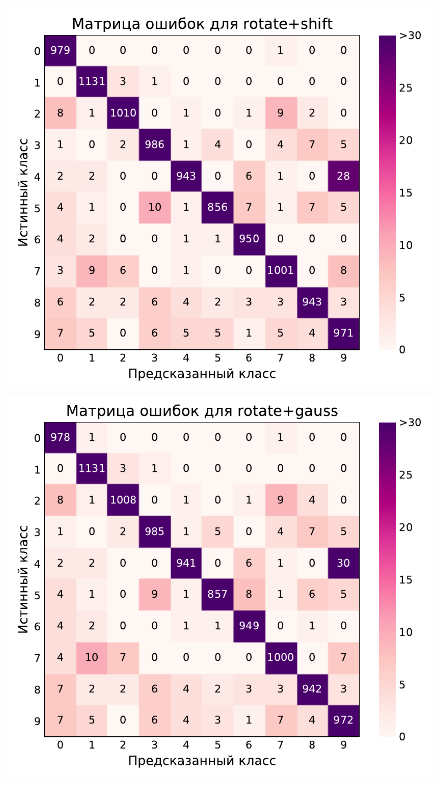 \documentclass[12pt]{article}
\begin{document}
\begin{figure}[!h]
    \includegraphics[scale=0.6]{6_aug_conf_mat_rotate+shift.pdf}
    \includegraphics[scale=0.6]{6_aug_conf_mat_rotate+gauss.pdf}

\end{figure}
\end{document}
